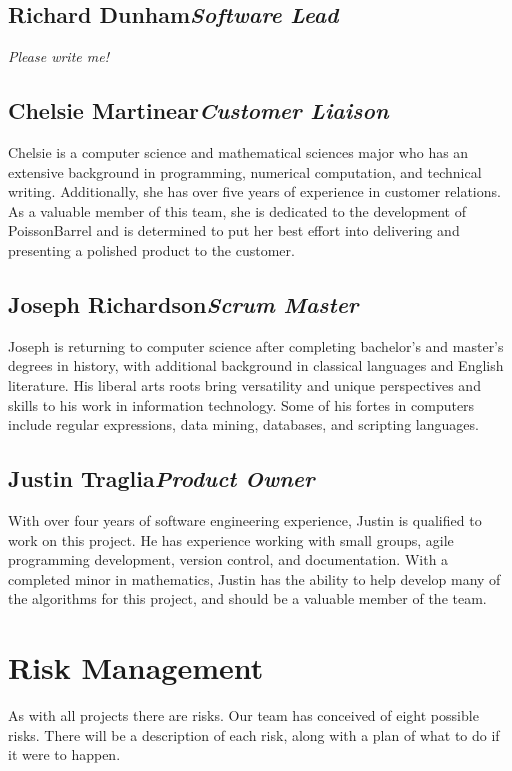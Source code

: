\documentclass[12pt]{article}
\begin{document}
\subsection*{Richard Dunham\hfill\textit{Software Lead}}
\textit{Please write me!}

\subsection*{Chelsie Martinear\hfill\textit{Customer Liaison}}
Chelsie is a computer science and mathematical sciences major who has an
extensive background in programming, numerical computation, and technical
writing. Additionally, she has over five years of experience in customer
relations. As a valuable member of this team, she is dedicated to the
development of PoissonBarrel and is determined to put her best effort into
delivering and presenting a polished product to the customer. 

\subsection*{Joseph Richardson\hfill\textit{Scrum Master}}
Joseph is returning to computer science after completing bachelor's and
master's degrees in history, with additional background in classical languages
and English literature. His liberal arts roots bring versatility and unique
perspectives and skills to his work in information technology. Some of his
fortes in computers include regular expressions, data mining, databases, and
scripting languages.

\subsection*{Justin Traglia\hfill\textit{Product Owner}}
With over four years of software engineering experience, Justin is qualified to
work on this project. He has experience working with small groups, agile
programming development, version control, and documentation. With a completed
minor in mathematics, Justin has the ability to help develop many of the
algorithms for this project, and should be a valuable member of the team.


\section{Risk Management}
As with all projects there are risks. Our team has conceived of eight possible
risks. There will be a description of each risk, along with a plan of what to
do if it were to happen.
\end{document}
